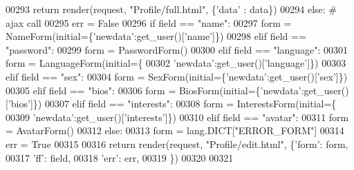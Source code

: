 \begin{DoxyCode}
00293                 \textcolor{keywordflow}{return} render(request, \textcolor{stringliteral}{"Profile/full.html"}, \{\textcolor{stringliteral}{'data'} : data\})
00294             \textcolor{keywordflow}{else}: \textcolor{comment}{# ajax call}
00295                 err = \textcolor{keyword}{False}
00296                 \textcolor{keywordflow}{if}   field == \textcolor{stringliteral}{"name"}:
00297                     form = NameForm(initial=\{\textcolor{stringliteral}{'newdata'}:get\_user()[\textcolor{stringliteral}{'name'}]\})
00298                 \textcolor{keywordflow}{elif} field == \textcolor{stringliteral}{"password"}:
00299                     form = PasswordForm()
00300                 \textcolor{keywordflow}{elif} field == \textcolor{stringliteral}{"language"}:
00301                     form = LanguageForm(initial=\{
00302                             \textcolor{stringliteral}{'newdata'}:get\_user()[\textcolor{stringliteral}{'language'}]\})
00303                 \textcolor{keywordflow}{elif} field == \textcolor{stringliteral}{"sex"}:
00304                     form = SexForm(initial=\{\textcolor{stringliteral}{'newdata'}:get\_user()[\textcolor{stringliteral}{'sex'}]\})
00305                 \textcolor{keywordflow}{elif} field == \textcolor{stringliteral}{"bios"}:
00306                     form = BiosForm(initial=\{\textcolor{stringliteral}{'newdata'}:get\_user()[\textcolor{stringliteral}{'bios'}]\})
00307                 \textcolor{keywordflow}{elif} field == \textcolor{stringliteral}{"interests"}:
00308                     form = InterestsForm(initial=\{
00309                             \textcolor{stringliteral}{'newdata'}:get\_user()[\textcolor{stringliteral}{'interests'}]\})
00310                 \textcolor{keywordflow}{elif} field == \textcolor{stringliteral}{"avatar"}:
00311                     form = AvatarForm()
00312                 \textcolor{keywordflow}{else}:
00313                     form = lang.DICT[\textcolor{stringliteral}{"ERROR\_FORM"}]
00314                     err = \textcolor{keyword}{True} 
00315 
00316                 \textcolor{keywordflow}{return} render(request, \textcolor{stringliteral}{"Profile/edit.html"}, \{\textcolor{stringliteral}{'form'}: form,
00317                                                              \textcolor{stringliteral}{'ff'}: field,
00318                                                              \textcolor{stringliteral}{'err'}: err,
00319                                                             \})
00320         
00321 
\end{DoxyCode}


